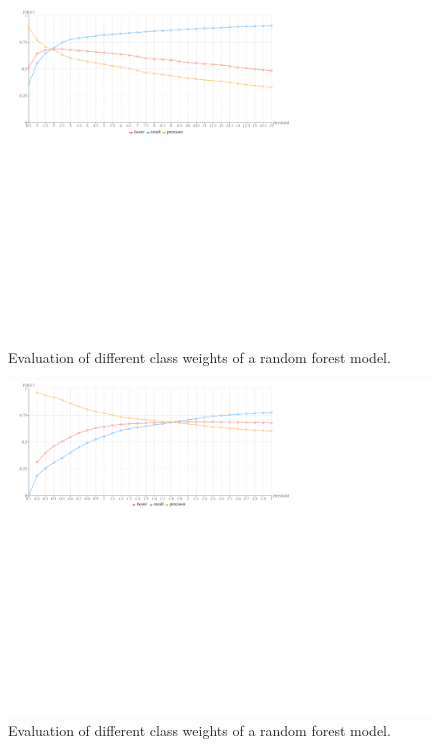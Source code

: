 \begin{figure}[H]
	\centering
	\includegraphics[width=\textwidth]{img/rf_thresh_large}
	\caption{Evaluation of different class weights of a random forest model.}
	\label{rf_thresh_large}
\end{figure}
\begin{figure}[H]
	\centering
	\includegraphics[width=\textwidth]{img/rf_thresh_small}
	\caption{Evaluation of different class weights of a random forest model.}
	\label{rf_thresh_small}
\end{figure}

